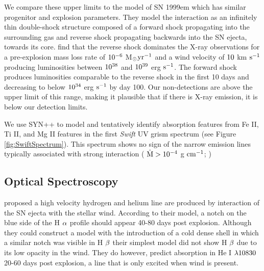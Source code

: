\documentclass[a4paper,fleqn,usenatbib]{mnras}
\newcommand{\msunperiod}{M$\rm{_{\odot}}$}
\begin{document}
We compare these upper limits to the model of SN 1999em \citep{2007chugai} which has similar progenitor and explosion parameters. 
They model the interaction as an infinitely thin double-shock structure \citep{1982chevalier, 1985nadyozhin} composed of a forward shock propagating into the surrounding gas and reverse shock propagating backwards into the SN ejecta, towards its core. 
\citet{2007chugai} find that the reverse shock dominates the X-ray observations for a pre-explosion mass loss rate of $\rm{10^{-6}}$ \msunperiod $\rm{yr^{-1}}$ and a wind velocity of $\rm{10}$ km $\rm{s^{-1}}$ producing luminosities between $\rm{10^{38}}$ and $\rm{10^{39}}$ erg $\rm{s^{-1}}$. 
The forward shock produces luminosities comparable to the reverse shock in the first 10 days and decreasing to below $\rm{10^{34}}$ erg $\rm{s^{-1}}$ by day 100.  
Our non-detections are above the upper limit of this range, making it plausible that if there is X-ray emission, it is below our detection limits.

We use SYN++ to model and tentatively identify absorption features from Fe II, Ti II, and Mg II features in the first {\it Swift} UV grism spectrum (see Figure \ref{fig:SwiftSpectrum}). 
This spectrum shows no sign of the narrow emission lines typically associated with strong interaction ( $\rm{\dot{M}>10^{-4}}$ g $\rm{cm^{-1}}$; \citealt{2012kiewe})
\subsection{Optical Spectroscopy} \label{sec:cachito}
\citet{2007chugai} proposed a high velocity hydrogen and helium line are produced by interaction of the SN ejecta with the stellar wind. 
According to their model, a notch on the blue side of the H $\rm{\alpha}$ profile should appear 40-80 days post explosion.
Although they could construct a model with the introduction of a cold dense shell in which a similar notch was visible in H $\rm{\beta}$ their simplest model did not show H $\rm{\beta}$ due to its low opacity in the wind.
They do however, predict absorption in He I $\rm{\lambda10830}$ 20-60 days post explosion, a line that is only excited when wind is present. 
\end{document}
